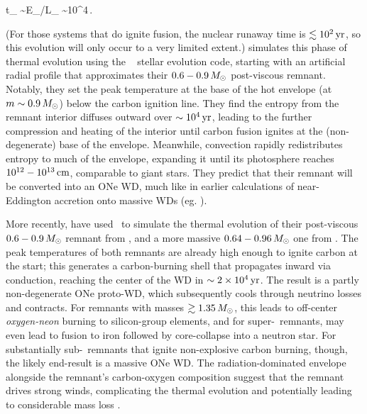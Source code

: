 \eqbegin
t_ \sim E_/L_ \sim 10^4\,.
\eqend

\noindent (For those systems that do ignite fusion, the nuclear runaway time is $\lesssim10^2\,\mathrm{yr}$, so this evolution will only occur to a very limited extent.)  \cite{shen+12} simulates this phase of thermal evolution using the \mesa\ \citep{paxt+11, paxt+13, paxt+15} stellar evolution code, starting with an artificial radial profile that approximates their $0.6-0.9\,\Msun$ post-viscous remnant.  Notably, they set the peak temperature at the base of the hot envelope (at $m \sim 0.9\,\Msun$) below the carbon ignition line.  They find the entropy from the remnant interior diffuses outward over $\sim10^4\,\mathrm{yr}$, leading to the further compression and heating of the interior until carbon fusion ignites at the (non-degenerate) base of the envelope.  Meanwhile, convection rapidly redistributes entropy to much of the envelope, expanding it until its photosphere reaches $10^{12}-10^{13}\,\mathrm{cm}$, comparable to giant stars.  They predict that their remnant will be converted into an ONe WD, much like in earlier calculations of near-Eddington accretion onto massive WDs (eg. \citealt{saion85}).

More recently, \cite{schw+16} have used \mesa\ to simulate the thermal evolution of their post-viscous $0.6-0.9\,\Msun$ remnant from \cite{schw+12}, and a more massive $0.64-0.96\,\Msun$ one from \cite{rask+14}.  The peak temperatures of both remnants are already high enough to ignite carbon at the start; this generates a carbon-burning shell that propagates inward via conduction, reaching the center of the WD in $\sim2\times10^4\,\mathrm{yr}$.  The result is a partly non-degenerate ONe proto-WD, which subsequently cools through neutrino losses and contracts.  For remnants with masses $\gtrsim1.35\,\Msun$, this leads to off-center \textit{oxygen-neon} burning to silicon-group elements, and for super-\Mch\ remnants, may even lead to fusion to iron followed by core-collapse into a neutron star.  For substantially sub-\Mch\ remnants that ignite non-explosive carbon burning, though, the likely end-result is a massive ONe WD.  The radiation-dominated envelope alongside the remnant's carbon-oxygen composition suggest that the remnant drives strong winds, complicating the thermal evolution and potentially leading to considerable mass loss \citep{shen+12, schw+16}.

